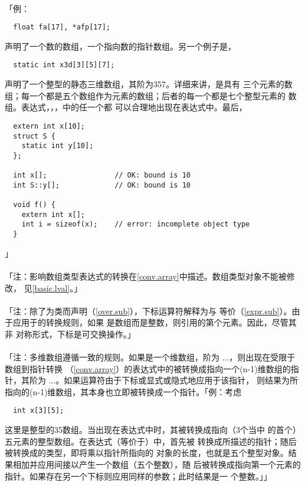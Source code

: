 \paragraph{}
「例：
\begin{lstlisting}
  float fa[17], *afp[17];
\end{lstlisting}
声明了一个数的数组，一个指向数的指针数组。另一个例子是，
\begin{lstlisting}
  static int x3d[3][5][7];
\end{lstlisting}
声明了一个整型的静态三维数组，其阶为3\ttim{}5\ttim{}7。详细来讲，是具有
三个元素的数组；每一个都是五个数组作为元素的数组；后者的每一个都是七个整型元素的
数组。表达式，，，中的任一个都
可以合理地出现在表达式中。最后，
\begin{lstlisting}
  extern int x[10];
  struct S {
    static int y[10];
  };

  int x[];                // OK: bound is 10
  int S::y[];             // OK: bound is 10

  void f() {
    extern int x[];
    int i = sizeof(x);    // error: incomplete object type
  }
\end{lstlisting}」

\paragraph{}
「注：影响数组类型表达式的转换在\ref{conv.array}中描述。数组类型对象不能被修改，
见\ref{basic.lval}。」

\paragraph{}
「注：除了为类而声明（\ref{over.sub}），下标运算符\tm{[]}解释为与
等价（\ref{expr.sub}）。由于应用于\tm{+}的转换规则，如果
是数组而是整数，则引用的第个元素。因此，尽管其非
对称形式，下标是可交换操作。」 

\paragraph{}
「注：多维数组遵循一致的规则。如果是一个维数组，阶为
\ttim{}\ttim...\ttim{}，则出现在受限于数组到指针转换
（\ref{conv.array}）的表达式中的被转换成指向一个(n-1)维数组的指针，其阶为
\ttim...\ttim{}。如果\tm{*}运算符由于下标或显式或隐式地应用于该指针，
则结果为所指向的(n-1)维数组，其本身也立即被转换成一个指针。「例：考虑
\begin{lstlisting}
  int x[3][5];
\end{lstlisting}
这里是整型的3\ttim5数组。当出现在表达式中时，其被转换成指向（3个当中
的首个）五元素的整型数组。在表达式（等价于）中，首先被
转换成所描述的指针；随后被转换成的类型，即将乘以指针所指向的
对象的长度，也就是五个整型对象。结果相加并应用间接以产生一个数组（五个整数），随
后被转换成指向第一个元素的指针。如果存在另一个下标则应用同样的参数；此时结果是一
个整数。」」

